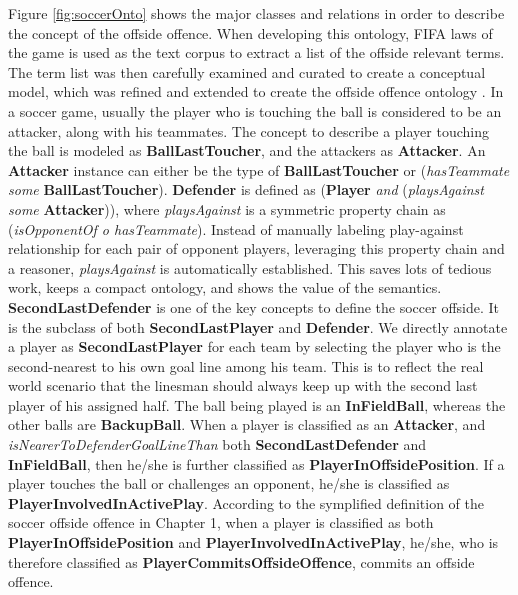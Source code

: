 Figure \ref{fig:soccerOnto} shows the major classes and relations in order to describe the concept of the offside offence.
When developing this ontology, FIFA laws of the game \cite{federation2016laws} is used as the text corpus to extract a list of the offside relevant terms.
The term list was then carefully examined and curated to create a conceptual model, which was refined and extended to create the offside offence ontology \cite{onto2016soccer}.
In a soccer game, usually the player who is touching the ball is considered to be an attacker, along with his teammates.
The concept to describe a player touching the ball is modeled as \textbf{BallLastToucher}, and the attackers as \textbf{Attacker}. 
An \textbf{Attacker} instance can either be the type of \textbf{BallLastToucher} or (\textit{hasTeammate some} \textbf{BallLastToucher}).
\textbf{Defender} is defined as (\textbf{Player} \textit{and} (\textit{playsAgainst some} \textbf{Attacker})),
where \textit{playsAgainst} is a symmetric property chain as (\textit{isOpponentOf o hasTeammate}).
Instead of manually labeling play-against relationship for each pair of opponent players, leveraging this property chain and a reasoner, \textit{playsAgainst} is automatically established.
This saves lots of tedious work, keeps a compact ontology, and shows the value of the semantics.
\textbf{SecondLastDefender} is one of the key concepts to define the soccer offside.
It is the subclass of both \textbf{SecondLastPlayer} and \textbf{Defender}.
We directly annotate a player as \textbf{SecondLastPlayer} for each team by selecting the player who is the second-nearest to his own goal line among his team. 
This is to reflect the real world scenario that the linesman should always keep up with the second last player of his assigned half.
The ball being played is an \textbf{InFieldBall}, whereas the other balls are \textbf{BackupBall}.
When a player is classified as an \textbf{Attacker}, and \textit{isNearerToDefenderGoalLineThan} both \textbf{SecondLastDefender} and \textbf{InFieldBall}, then he/she is further classified as \textbf{PlayerInOffsidePosition}.
If a player touches the ball or challenges an opponent, he/she is classified as \textbf{PlayerInvolvedInActivePlay}.
According to the symplified definition of the soccer offside offence in Chapter 1, when a player is classified as both \textbf{PlayerInOffsidePosition} and \textbf{PlayerInvolvedInActivePlay}, he/she, who is therefore classified as \textbf{PlayerCommitsOffsideOffence}, commits an offside offence.

